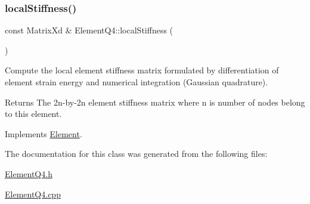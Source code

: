 \mbox{\label{class_element_q4_a9a127fdfd6f80efe3c35f20d7b1296cf}} 
\subsubsection{\texorpdfstring{local\+Stiffness()}{localStiffness()}}
{\footnotesize\ttfamily const Matrix\+Xd \& Element\+Q4\+::local\+Stiffness (\begin{DoxyParamCaption}{ }\end{DoxyParamCaption})\hspace{0.3cm}{\ttfamily [virtual]}}



Compute the local element stiffness matrix formulated by differentiation of element strain energy and numerical integration (Gaussian quadrature). 

\begin{DoxyReturn}{Returns}
The 2n-\/by-\/2n element stiffness matrix where n is number of nodes belong to this element. 
\end{DoxyReturn}


Implements \mbox{\hyperlink{class_element_a603fbe060b5d6979506f0d2130e6c171}{Element}}.



The documentation for this class was generated from the following files\+:\begin{DoxyCompactItemize}
\item 
\mbox{\hyperlink{_element_q4_8h}{Element\+Q4.\+h}}\item 
\mbox{\hyperlink{_element_q4_8cpp}{Element\+Q4.\+cpp}}\end{DoxyCompactItemize}
